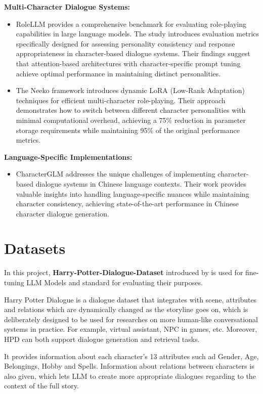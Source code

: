 \documentclass{article}
\begin{document}
\textbf{Multi-Character Dialogue Systems:}
\begin{itemize}
\item RoleLLM \cite{wang2023} provides a comprehensive benchmark for evaluating role-playing capabilities in large language models. The study introduces evaluation metrics specifically designed for assessing personality consistency and response appropriateness in character-based dialogue systems. Their findings suggest that attention-based architectures with character-specific prompt tuning achieve optimal performance in maintaining distinct personalities.
\item The Neeko framework \cite{yu2024} introduces dynamic LoRA (Low-Rank Adaptation) techniques for efficient multi-character role-playing. Their approach demonstrates how to switch between different character personalities with minimal computational overhead, achieving a 75\% reduction in parameter storage requirements while maintaining 95\% of the original performance metrics.
\end{itemize}

\textbf{Language-Specific Implementations:}
\begin{itemize}
\item CharacterGLM \cite{zhou2023} addresses the unique challenges of implementing character-based dialogue systems in Chinese language contexts. Their work provides valuable insights into handling language-specific nuances while maintaining character consistency, achieving state-of-the-art performance in Chinese character dialogue generation.
\end{itemize}



\section{Datasets}
In this project, \textbf{Harry-Potter-Dialogue-Dataset} introduced by \cite{chen2023} is used for fine-tuning LLM Models and standard for evaluating their purposes.

Harry Potter Dialogue is a dialogue dataset that integrates with scene, attributes and relations which are dynamically changed as the storyline goes on, which is deliberately designed to be used for researches on more human-like conversational systems in practice. For example, virtual assistant, NPC in games, etc. Moreover, HPD can both support dialogue generation and retrieval tasks.

It provides information about each character's 13 attributes such ad Gender, Age, Belongings, Hobby and Spells. Information about relations between characters is also given, which lets LLM to create more appropriate dialogues regarding to the context of the full story.
\end{document}
